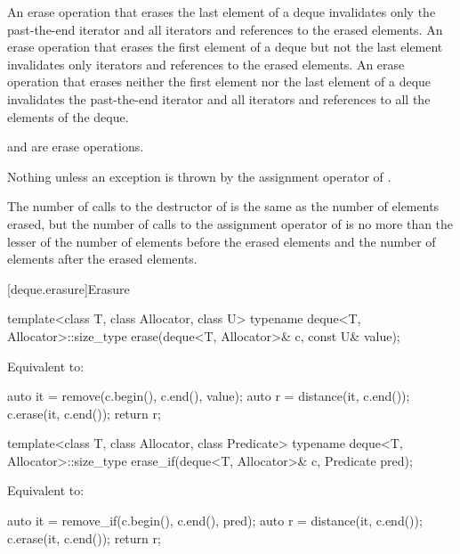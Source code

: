 \begin{itemdescr}
\pnum
\effects
An erase operation that erases the last element of a deque invalidates only the past-the-end iterator
and all iterators and references to the erased elements. An erase operation that erases the first
element of a deque but not the last element invalidates only iterators
and references to the erased elements. An erase operation
that erases neither the first element nor the last element of a deque invalidates the past-the-end
iterator and all iterators and references to all the elements of the deque.
\begin{note}
 and  are erase operations.
\end{note}

\pnum
\throws
Nothing unless an exception is thrown by the assignment operator of
.

\pnum
\complexity
The number of calls to the destructor of  is the same as the
number of elements erased, but the number of calls to the assignment operator of  is
no more than the lesser of the number of elements before the erased elements and the number of elements after the erased elements.
\end{itemdescr}

[deque.erasure]{Erasure}

%
\begin{itemdecl}
template<class T, class Allocator, class U>
  typename deque<T, Allocator>::size_type
    erase(deque<T, Allocator>& c, const U& value);
\end{itemdecl}

\begin{itemdescr}
\pnum
\effects
Equivalent to:
\begin{codeblock}
auto it = remove(c.begin(), c.end(), value);
auto r = distance(it, c.end());
c.erase(it, c.end());
return r;
\end{codeblock}
\end{itemdescr}

%
\begin{itemdecl}
template<class T, class Allocator, class Predicate>
  typename deque<T, Allocator>::size_type
    erase_if(deque<T, Allocator>& c, Predicate pred);
\end{itemdecl}

\begin{itemdescr}
\pnum
\effects
Equivalent to:
\begin{codeblock}
auto it = remove_if(c.begin(), c.end(), pred);
auto r = distance(it, c.end());
c.erase(it, c.end());
return r;
\end{codeblock}
\end{itemdescr}

